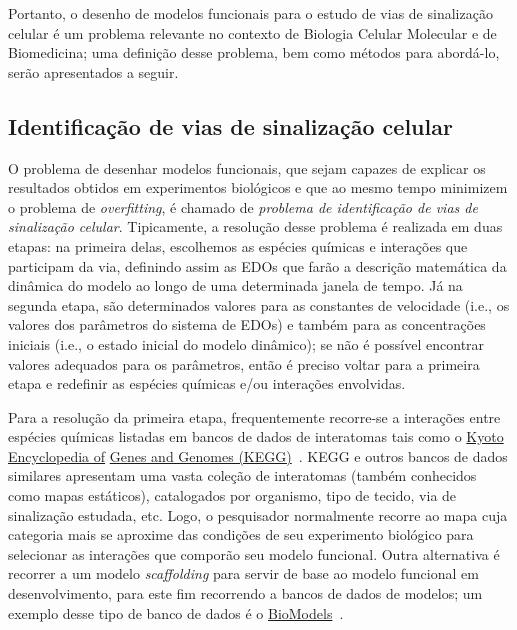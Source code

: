 \documentclass[12pt]{article}
\begin{document}
Portanto, o desenho de modelos funcionais para o estudo de vias de sinalização celular é um problema relevante no contexto de Biologia Celular Molecular e de Biomedicina; uma definição desse problema, bem como métodos para abordá-lo, serão apresentados a seguir.

\subsection{Identificação de vias de sinalização celular}
O problema de desenhar modelos funcionais, que sejam capazes de explicar os resultados obtidos em experimentos biológicos e que ao mesmo tempo minimizem o problema de {\em overfitting}, é chamado de {\em problema de identificação de vias de sinalização celular}. Tipicamente, a resolução desse problema é realizada em duas etapas: na primeira delas, escolhemos as espécies químicas e interações que participam da via, definindo assim as EDOs que farão a descrição matemática da dinâmica do modelo ao longo de uma determinada janela de tempo. Já na segunda etapa, são determinados valores para as constantes de velocidade (i.e., os valores dos parâmetros do sistema de EDOs) e também para as concentrações iniciais (i.e., o estado inicial do modelo dinâmico); se não é possível encontrar valores adequados para os parâmetros, então é preciso voltar para a primeira etapa e redefinir as espécies químicas e/ou interações envolvidas.

Para a resolução da primeira etapa, frequentemente recorre-se a interações entre espécies químicas listadas em bancos de dados de interatomas tais como o \href{http://www.genome.jp/kegg/}{Kyoto Encyclopedia of} \href{http://www.genome.jp/kegg/}{Genes and Genomes (KEGG)}~\cite{Kanehisa2000kegg}. KEGG e outros bancos de dados similares apresentam uma vasta coleção de interatomas (também conhecidos como mapas estáticos), catalogados por organismo, tipo de tecido, via de sinalização estudada, etc. Logo, o pesquisador normalmente recorre ao mapa cuja categoria mais se aproxime das condições de seu experimento biológico para selecionar as interações que comporão seu modelo funcional. Outra alternativa é recorrer a um modelo {\em scaffolding} para servir de base ao modelo funcional em desenvolvimento, para este fim recorrendo a bancos de dados de modelos; um exemplo desse tipo de banco de dados é o \href{https://www.ebi.ac.uk/biomodels-main/}{BioModels}~\cite{le2006biomodels}.
\end{document}
